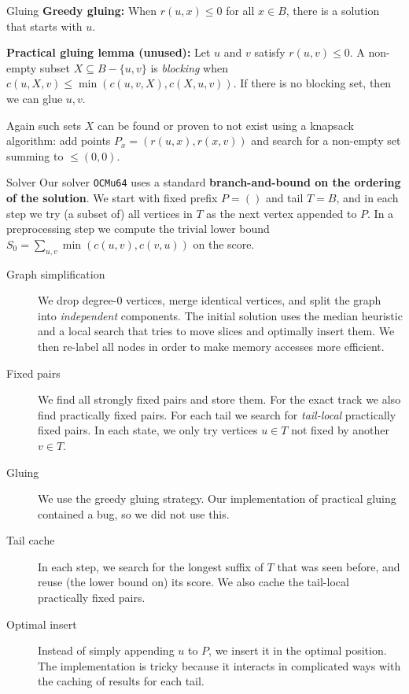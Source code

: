 \documentclass[final]{beamer}
\newlength{\colwidth}
\theoremstyle{remark}
\begin{document}
\begin{frame}[t]
\begin{columns}[t]
\begin{column}{\colwidth}
\begin{block}{Gluing}
        \textbf{Greedy gluing:}
        When $r(u, x)\leq 0$ for all $x\in B$, there is a solution that
        starts with $u$.

        \textbf{Practical gluing lemma (unused):}
        Let $u$ and $v$ satisfy $r(u, v) \leq 0$.
        A non-empty subset $X\subseteq B-\{u,v\}$ is \emph{blocking} when $c(u, X, v) \leq
        \min(c(u, v, X), c(X, u, v))$. If there is no blocking set, then we can glue $u, v$.

        Again such sets $X$ can be found or proven to not exist using a knapsack
        algorithm: add points $P_x = (r(u, x), r(x, v))$ and search for a non-empty
        set summing to $\leq{}(0,0)$.
      \end{block}

      \begin{block}{Solver}
        Our solver \texttt{OCMu64} uses a standard \textbf{branch-and-bound on the ordering of the
        solution}.  We start with fixed prefix $P=()$ and tail $T=B$, and in each step we try (a
        subset of) all vertices in $T$ as the next vertex appended to $P$.
        In a preprocessing step we compute the trivial lower bound $S_0 =
        \sum_{u,v}\min(c(u,v),c(v,u))$ on the score.

        \begin{description}
        \item[Graph simplification] We drop degree-$0$ vertices, merge identical
          vertices, and split the graph into \emph{independent} components.
          The initial solution uses the median heuristic and a local search that tries to move
          slices and optimally insert them. We then re-label all nodes in order to make
          memory accesses more efficient.
        \item[Fixed pairs] We find all strongly fixed pairs and store them. For the
          exact track we also find practically fixed pairs.
          For each tail we search for \emph{tail-local} practically fixed pairs. In each state, we only
          try vertices $u\in T$ not fixed by another $v\in T$.
        \item[Gluing] We use the greedy gluing strategy. Our implementation
          of practical gluing contained a bug, so we did not use this.
        \item[Tail cache] In each step, we search for the longest suffix of $T$ that
          was seen before, and reuse (the lower bound on) its score. We also
          cache the tail-local practically fixed pairs.
        \item[Optimal insert] Instead of simply appending $u$ to $P$, we
          insert it in the optimal position. The
          implementation is tricky because it interacts in complicated ways with
          the caching of results for each tail.
        \end{description}
      \end{block}


\end{column}
\end{columns}
\end{frame}
\end{document}
